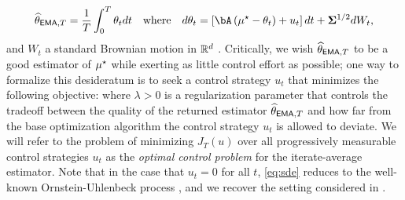 \begin{align}\label{eq:sde}
    \thetema[T] = \frac 1T \int_0^T \theta_t d t \quad \text{where} \quad d \theta_t = \left[\bA \left( \mustar - \theta_t \right) + u_t\right] d t + \bSigma^{1/2} d W_t,
\end{align}
and $W_t$ a standard Brownian motion in $\rr^d$ \citep{kutoyants2004statistical,yong1999stochastic}.  Critically, we wish $\thetema[T]$ to be a good estimator of $\mustar$ while exerting as little control effort as possible; one way to formalize this desideratum is to seek a control strategy $u_t$ that minimizes the following objective:
\iftoggle{colt}{
\begin{align}\label{eq:objective}
    J_T(u) = \ee\left[ \|\thetema[T] - \mustar\|^2 + \lambda \cdot \int_0^T \norm{u_t}^2 d t \right],
\end{align}
}{
\begin{align}\label{eq:objective}
    J_T(u) = \ee\left[ \norm{\thetema[T] - \mustar}^2 + \lambda \cdot \int_0^T \norm{u_t}^2 d t \right],
\end{align}
}
where $\lambda > 0$ is a regularization parameter that controls the tradeoff between the quality of the returned estimator $\thetema[T]$ and how far from the base optimization algorithm the control strategy $u_t$ is allowed to deviate.  We will refer to the problem of minimizing $J_T(u)$ over all progressively measurable control strategies $u_t$ as the \emph{optimal control problem} for the iterate-average estimator.  Note that in the case that $u_t = 0$ for all $t$, \eqref{eq:sde} reduces to the well-known Ornstein-Uhlenbeck process \citep{kutoyants2004statistical,mandt2015continuous}, and we recover the setting considered in \citet{block2025ema}.


